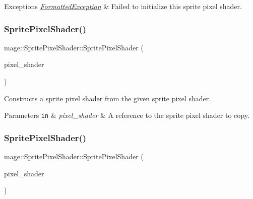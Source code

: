 \begin{DoxyExceptions}{Exceptions}
{\em \hyperlink{structmage_1_1_formatted_exception}{Formatted\+Exception}} & Failed to initialize this sprite pixel shader. \\
\hline
\end{DoxyExceptions}
\hypertarget{classmage_1_1_sprite_pixel_shader_a5803ea69e04c58528f9c4fbbc0f4efbc}{}\label{classmage_1_1_sprite_pixel_shader_a5803ea69e04c58528f9c4fbbc0f4efbc} 
\subsubsection{\texorpdfstring{Sprite\+Pixel\+Shader()}{SpritePixelShader()}\hspace{0.1cm}{\footnotesize\ttfamily [2/3]}}
{\footnotesize\ttfamily mage\+::\+Sprite\+Pixel\+Shader\+::\+Sprite\+Pixel\+Shader (\begin{DoxyParamCaption}\item[{const \hyperlink{classmage_1_1_sprite_pixel_shader}{Sprite\+Pixel\+Shader} \&}]{pixel\+\_\+shader }\end{DoxyParamCaption})\hspace{0.3cm}{\ttfamily [delete]}}

Constructs a sprite pixel shader from the given sprite pixel shader.


\begin{DoxyParams}[1]{Parameters}
\mbox{\tt in}  & {\em pixel\+\_\+shader} & A reference to the sprite pixel shader to copy. \\
\hline
\end{DoxyParams}
\hypertarget{classmage_1_1_sprite_pixel_shader_a2ec1a47d5ada6e2e319605108f971d0c}{}\label{classmage_1_1_sprite_pixel_shader_a2ec1a47d5ada6e2e319605108f971d0c} 
\subsubsection{\texorpdfstring{Sprite\+Pixel\+Shader()}{SpritePixelShader()}\hspace{0.1cm}{\footnotesize\ttfamily [3/3]}}
{\footnotesize\ttfamily mage\+::\+Sprite\+Pixel\+Shader\+::\+Sprite\+Pixel\+Shader (\begin{DoxyParamCaption}\item[{\hyperlink{classmage_1_1_sprite_pixel_shader}{Sprite\+Pixel\+Shader} \&\&}]{pixel\+\_\+shader }\end{DoxyParamCaption})\hspace{0.3cm}{\ttfamily [default]}}

